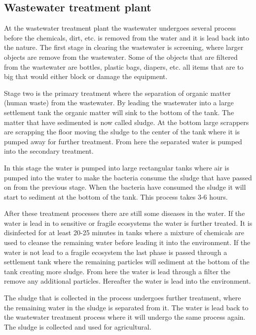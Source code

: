 \subsection{Wastewater treatment plant}\label{subse:Wastewater treatment plant}
At the wastewater treatment plant the wastewater undergoes several process before the chemicals, dirt, etc. is removed from the water and it is lead back into the nature. The first stage in clearing the wastewater is screening, where larger objects are remove from the wastewater. Some of the objects that are filtered from the wastewater are bottles, plastic bags, diapers, etc. all items that are to big that would either block or damage the equipment. 

Stage two is the primary treatment where the separation of organic matter (human waste) from the wastewater. By leading the wastewater into a large settlement tank the organic matter will sink to the bottom of the tank. The matter that have sedimented is now called sludge. At the bottom large scrappers are scrapping the floor moving the sludge to the center of the tank where it is pumped away for further treatment. From here the separated water is pumped into the secondary treatment. 

In this stage the water is pumped into large rectangular tanks where air is pumped into the water to make the bacteria consume the sludge that have passed on from the previous stage. When the bacteria have consumed the sludge it will start to sediment at the bottom of the tank. This process takes 3-6 hours.  

After these treatment processes there are still some diseases in the water. If the water is lead in to sensitive or fragile ecosystems the water is further treated. It is disinfected for at least 20-25 minutes in tanks where a mixture of chemicals are used to cleanse the remaining water before leading it into the environment. If the water is not lead to a fragile ecosystem the last phase is passed through a settlement tank where the remaining particles will sediment at the bottom of the tank creating more sludge. From here the water is lead through a filter the remove any additional particles. Hereafter the water is lead into the environment. 

The sludge that is collected in the process undergoes further treatment, where the remaining water in the sludge is separated from it. The water is lead back to the wastewater treatment process where it will undergo the same process again. The sludge is collected and used for agricultural.





